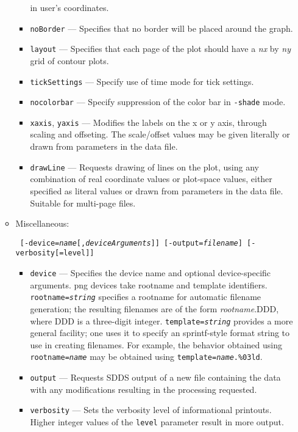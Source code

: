 \begin{itemize}
\begin{itemize}
\begin{itemize}
        in user's coordinates.  
        \item \verb|noBorder| --- Specifies that no border will be placed around the graph.
        \item \verb|layout| --- Specifies that each page of the plot should have a {\em nx} by {\em ny} grid of contour plots.
        \item \verb|tickSettings| --- Specify use of time mode for tick settings.
        \item \verb|nocolorbar| --- Specify suppression of the color bar in \verb|-shade| mode.
        \item \verb|xaxis|, \verb|yaxis| --- Modifies the labels on the x or y axis, through scaling and offseting.
          The scale/offset values may be given literally or drawn from parameters in the data file.
        \item \verb|drawLine| --- Requests drawing of lines on the plot, using any combination of real coordinate values
          or plot-space values, either specified as literal values or drawn from parameters in the data file.
          Suitable for multi-page files.
        \end{itemize}
    \item Miscellaneous:
\begin{flushleft}{\tt
[-device={\em name}[,{\em deviceArguments}]] 
[-output={\em filename}] [-verbosity[=level]]
}\end{flushleft}
        \begin{itemize}
        \item \verb|device| --- Specifies the device name and optional device-specific arguments. png devices
        take rootname and template identifiers. {\tt rootname={\em string}} specifies a rootname
        for automatic filename generation; the resulting filenames are of the form {\em rootname}.DDD, where DDD 
        is a three-digit integer. {\tt template={\em string}} provides a more general facility; one uses it to
        specify an sprintf-style format string to use in creating filenames. For example, the behavior obtained
        using {\tt rootname={\em name}} may be obtained  using {\tt template={\em name}.\%03ld}.
        \item \verb|output| --- Requests SDDS output of a new file containing the data with any modifications
                resulting in the processing requested.
        \item \verb|verbosity| --- Sets the verbosity level of informational printouts. Higher integer values
                of the \verb|level| parameter result in more output.

\end{itemize}
\end{itemize}
\end{itemize}
